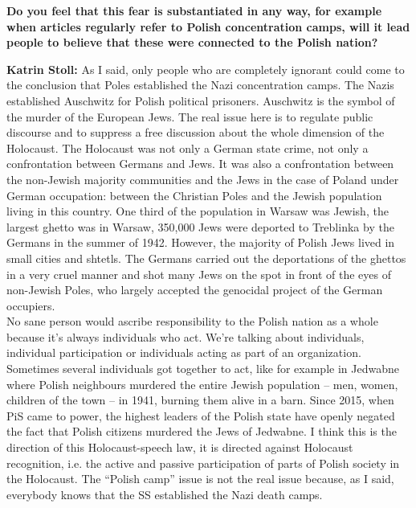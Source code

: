 \textbf{Do you feel that this fear is substantiated in any way, for example when articles regularly refer to Polish concentration camps, will it lead people to believe that these were connected to the Polish nation?}

\textbf{Katrin Stoll:} As I said, only people who are completely ignorant could come to the conclusion that Poles established the Nazi concentration camps. The Nazis established Auschwitz for Polish political prisoners. Auschwitz is the symbol of the murder of the European Jews. The real issue here is to regulate public discourse and to suppress a free discussion about the whole dimension of the Holocaust. The Holocaust was not only a German state crime, not only a confrontation between Germans and Jews. It was also a confrontation between the non-Jewish majority communities and the Jews in the case of Poland under German occupation: between the Christian Poles and the Jewish population living in this country. One third of the population in Warsaw was Jewish, the largest ghetto was in Warsaw, 350,000 Jews were deported to Treblinka by the Germans in the summer of 1942. However, the majority of Polish Jews lived in small cities and shtetls. The Germans carried out the deportations of the ghettos in a very cruel manner and shot many Jews on the spot in front of the eyes of non-Jewish Poles, who largely accepted the genocidal project of the German occupiers.\\ 
No sane person would ascribe responsibility to the Polish nation as a whole because it’s always individuals who act. We’re talking about individuals, individual participation or individuals acting as part of an organization. Sometimes several individuals got together to act, like for example in Jedwabne where Polish neighbours murdered the entire Jewish population – men, women, children of the town – in 1941, burning them alive in a barn. Since 2015, when PiS came to power, the highest leaders of the Polish state have openly negated the fact that Polish citizens murdered the Jews of Jedwabne. I think this is the direction of this Holocaust-speech law, it is directed against Holocaust recognition, i.e. the active and passive participation of parts of Polish society in the Holocaust. The ``Polish camp'' issue is not the real issue because, as I said, everybody knows that the SS established the Nazi death camps. 

